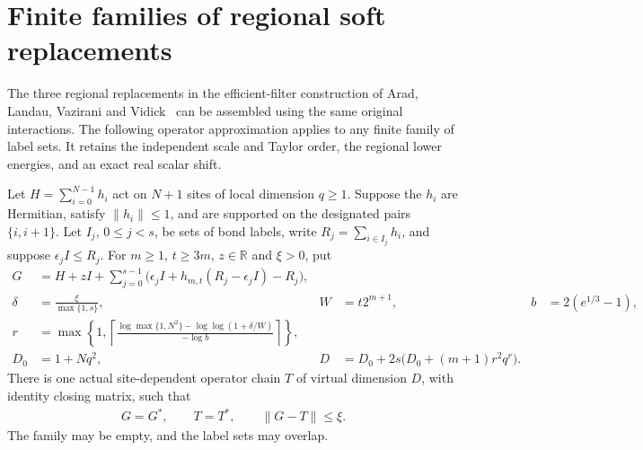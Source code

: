 \section{Finite families of regional soft replacements}
\label{sec:regional_soft_mpo}

The three regional replacements in the efficient-filter construction of
Arad, Landau, Vazirani and Vidick~\cite[lines 1373--1392 and 1435--1442]{Arad2016RigorousRG}
can be assembled using the same original interactions. The following
operator approximation applies to any finite family of label sets. It
retains the independent scale and Taylor order, the regional lower energies,
and an exact real scalar shift.

\begin{lemma}
    \label{lem:regional_soft_hermitian_mpo}
    \leanok
    Let $H=\sum_{i=0}^{N-1}h_i$ act on $N+1$ sites of local dimension
    $q\geq1$. Suppose the $h_i$ are Hermitian, satisfy $\|h_i\|\leq1$,
    and are supported on the designated pairs $\{i,i+1\}$. Let
    $I_j$, $0\leq j<s$, be sets of bond labels, write
    $R_j=\sum_{i\in I_j}h_i$, and suppose $\epsilon_j I\leq R_j$.
    For $m\geq1$, $t\geq3m$, $z\in\mathbb R$ and $\xi>0$, put
    \begin{align}
        G      & =H+zI+\sum_{j=0}^{s-1}
        \bigl(\epsilon_jI+h_{m,t}(R_j-\epsilon_jI)-R_j\bigr),                        \\
        \delta & =\frac{\xi}{\max\{1,s\}}, &
        W      & =t2^{m+1},                & b & =2(e^{1/3}-1),                      \\
        r      & =\max\left\{1,
        \left\lceil\frac{\log\max\{1,N^2\}-\log\log(1+\delta/W)}
        {-\log b}\right\rceil\right\},                                               \\
        D_0    & =1+Nq^2,                  & D & =D_0+2s\bigl(D_0+(m+1)r^2q^r\bigr).
    \end{align}
    There is one actual site-dependent operator chain $T$ of virtual
    dimension $D$, with identity closing matrix, such that
    \begin{align}
        G=G^*,\qquad T=T^*,\qquad \|G-T\|\leq\xi.
    \end{align}
    The family may be empty, and the label sets may overlap.
\end{lemma}
